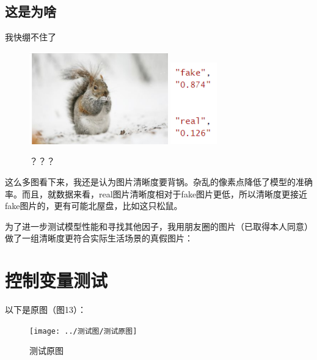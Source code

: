 \documentclass[boldfont,linespread=1.35]{ctexart}
\begin{document}
\subsection{这是为啥}
我快绷不住了
\begin{figure}[h]
	\centering
	{\includegraphics[width=6cm]{14}}
	{\includegraphics[width=2cm]{15}}
	\color{gray}\caption{？？？}
\end{figure}

这么多图看下来，我还是认为图片清晰度要背锅。杂乱的像素点降低了模型的准确率。而且，就数据来看，real图片清晰度相对于fake图片更低，所以清晰度更接近fake图片的，更有可能北屋盘，比如这只松鼠。

为了进一步测试模型性能和寻找其他因子，我用朋友圈的图片（已取得本人同意）做了一组清晰度更符合实际生活场景的真假图片：

\section{控制变量测试}
以下是原图（图13）：
\begin{figure}[h]
	\centering
	\texttt{[image: ../测试图/测试原图]}
	\color{gray}\caption{测试原图}
\end{figure}
\end{document}
